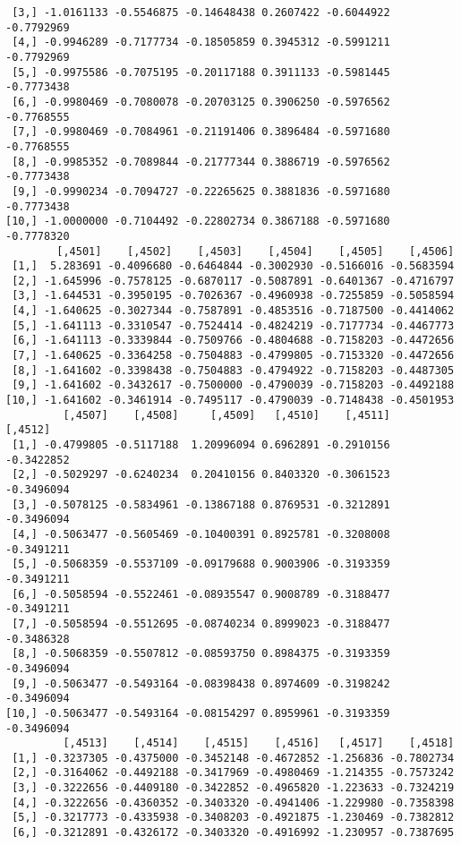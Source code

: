 \documentclass[
  letterpaper,
  DIV=11,
  numbers=noendperiod]{scrreprt}
\begin{document}
\begin{verbatim}
 [3,] -1.0161133 -0.5546875 -0.14648438 0.2607422 -0.6044922 -0.7792969
 [4,] -0.9946289 -0.7177734 -0.18505859 0.3945312 -0.5991211 -0.7792969
 [5,] -0.9975586 -0.7075195 -0.20117188 0.3911133 -0.5981445 -0.7773438
 [6,] -0.9980469 -0.7080078 -0.20703125 0.3906250 -0.5976562 -0.7768555
 [7,] -0.9980469 -0.7084961 -0.21191406 0.3896484 -0.5971680 -0.7768555
 [8,] -0.9985352 -0.7089844 -0.21777344 0.3886719 -0.5976562 -0.7773438
 [9,] -0.9990234 -0.7094727 -0.22265625 0.3881836 -0.5971680 -0.7773438
[10,] -1.0000000 -0.7104492 -0.22802734 0.3867188 -0.5971680 -0.7778320
        [,4501]    [,4502]    [,4503]    [,4504]    [,4505]    [,4506]
 [1,]  5.283691 -0.4096680 -0.6464844 -0.3002930 -0.5166016 -0.5683594
 [2,] -1.645996 -0.7578125 -0.6870117 -0.5087891 -0.6401367 -0.4716797
 [3,] -1.644531 -0.3950195 -0.7026367 -0.4960938 -0.7255859 -0.5058594
 [4,] -1.640625 -0.3027344 -0.7587891 -0.4853516 -0.7187500 -0.4414062
 [5,] -1.641113 -0.3310547 -0.7524414 -0.4824219 -0.7177734 -0.4467773
 [6,] -1.641113 -0.3339844 -0.7509766 -0.4804688 -0.7158203 -0.4472656
 [7,] -1.640625 -0.3364258 -0.7504883 -0.4799805 -0.7153320 -0.4472656
 [8,] -1.641602 -0.3398438 -0.7504883 -0.4794922 -0.7158203 -0.4487305
 [9,] -1.641602 -0.3432617 -0.7500000 -0.4790039 -0.7158203 -0.4492188
[10,] -1.641602 -0.3461914 -0.7495117 -0.4790039 -0.7148438 -0.4501953
         [,4507]    [,4508]     [,4509]   [,4510]    [,4511]    [,4512]
 [1,] -0.4799805 -0.5117188  1.20996094 0.6962891 -0.2910156 -0.3422852
 [2,] -0.5029297 -0.6240234  0.20410156 0.8403320 -0.3061523 -0.3496094
 [3,] -0.5078125 -0.5834961 -0.13867188 0.8769531 -0.3212891 -0.3496094
 [4,] -0.5063477 -0.5605469 -0.10400391 0.8925781 -0.3208008 -0.3491211
 [5,] -0.5068359 -0.5537109 -0.09179688 0.9003906 -0.3193359 -0.3491211
 [6,] -0.5058594 -0.5522461 -0.08935547 0.9008789 -0.3188477 -0.3491211
 [7,] -0.5058594 -0.5512695 -0.08740234 0.8999023 -0.3188477 -0.3486328
 [8,] -0.5068359 -0.5507812 -0.08593750 0.8984375 -0.3193359 -0.3496094
 [9,] -0.5063477 -0.5493164 -0.08398438 0.8974609 -0.3198242 -0.3496094
[10,] -0.5063477 -0.5493164 -0.08154297 0.8959961 -0.3193359 -0.3496094
         [,4513]    [,4514]    [,4515]    [,4516]   [,4517]    [,4518]
 [1,] -0.3237305 -0.4375000 -0.3452148 -0.4672852 -1.256836 -0.7802734
 [2,] -0.3164062 -0.4492188 -0.3417969 -0.4980469 -1.214355 -0.7573242
 [3,] -0.3222656 -0.4409180 -0.3422852 -0.4965820 -1.223633 -0.7324219
 [4,] -0.3222656 -0.4360352 -0.3403320 -0.4941406 -1.229980 -0.7358398
 [5,] -0.3217773 -0.4335938 -0.3408203 -0.4921875 -1.230469 -0.7382812
 [6,] -0.3212891 -0.4326172 -0.3403320 -0.4916992 -1.230957 -0.7387695

\end{verbatim}
\end{document}

